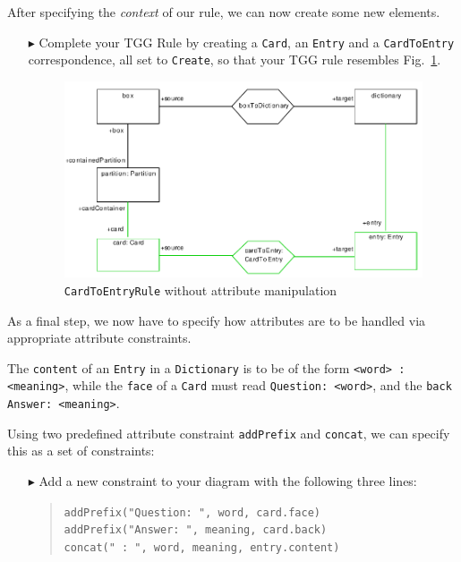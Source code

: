 After specifying the \emph{context} of our rule, we can now create some new elements.

\begin{enumerate}
\item[$\blacktriangleright$] Complete your TGG Rule by creating a \texttt{Card}, an \texttt{Entry} and a \texttt{CardToEntry} correspondence, all set to \texttt{Create}, so that your TGG rule resembles Fig.~\ref{fig:cardtoentry_1}.

\begin{figure}[htbp]
\begin{center}
  \includegraphics[width=\textwidth]{pics/tggBilder/tggRule/tgg19}
  \caption{\texttt{CardToEntryRule} without attribute manipulation}  
  \label{fig:cardtoentry_1}
\end{center}
\end{figure}

\end{enumerate}

As a final step, we now have to specify how attributes are to be handled via appropriate attribute constraints.

The \texttt{content} of an \texttt{Entry} in a \texttt{Dictionary} is to be of the form \texttt{<word> : <meaning>}, while the \texttt{face} of a \texttt{Card} must read \texttt{Question: <word>}, and the \texttt{back} \texttt{Answer: <meaning>}.

Using two predefined attribute constraint \texttt{addPrefix} and \texttt{concat}, we can specify this as a set of constraints:

\begin{enumerate}
\item[$\blacktriangleright$] Add a new constraint to your diagram with the following three lines:
\begin{quotation}
\noindent \texttt{addPrefix("Question: ", word, card.face)}\\ 
\texttt{addPrefix("Answer: ", meaning, card.back)}\\
\texttt{concat("~:~", word, meaning, entry.content)} 
\end{quotation}

\end{enumerate}

